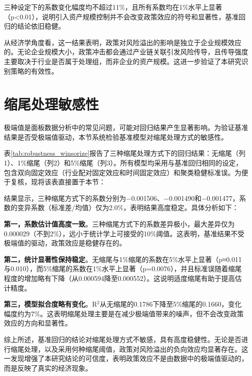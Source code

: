 三种设定下的系数变化幅度均不超过11\%，且所有系数均在1\%水平上显著（p<0.01），说明引入资产规模控制并不会改变政策效应的符号和显著性，基准回归的结论依旧稳健。

从经济学角度看，这一结果表明，政策对风险溢出的影响是独立于企业规模效应的。无论企业规模大小，政策冲击都会通过产业链关联引发风险传导，且传导强度主要取决于行业是否属于处理组，而非企业的资产规模。这进一步验证了本研究识别策略的有效性。


\section{缩尾处理敏感性}
\label{sec:robustness_winsorize}

极端值是面板数据分析中的常见问题，可能对回归结果产生显著影响。为验证基准结果是否受极端值驱动，本节系统检验基准模型对缩尾处理方式的敏感性。

表\ref{tab:robustness_winsorize}报告了三种缩尾处理方式下的回归结果：无缩尾（列1）、1\%缩尾（列2）和5\%缩尾（列3）。所有模型均采用与基准回归相同的设定，包含双向固定效应（行业配对固定效应和时间固定效应）和聚类稳健标准误。为便于复核，现将该表直接置于本节：

结果显示，三种缩尾方式下的系数分别为$-$0.001506、$-$0.001490和$-$0.001477，系数的变异系数（标准差/均值）仅为2.0\%，表明结果高度稳定。具体分析如下：

\textbf{第一，系数估计值高度一致}。三种缩尾方式下的系数差异极小，最大差异仅为0.000029（不到2\%），远小于统计学上可接受的10\%阈值。这表明，基准结果不受极端值的驱动，政策效应是稳健存在的。

\textbf{第二，统计显著性保持稳定}。无缩尾与1\%缩尾的系数在5\%水平上显著（p≈0.011与0.010），而5\%缩尾的系数在1\%水平上显著（p=0.0076），并且标准误随着缩尾程度的增加略有下降（从0.000594降至0.000552）。这说明适度缩尾有助于提高估计精度。

\textbf{第三，模型拟合度略有变化}。R$^2$从无缩尾的0.1786下降至5\%缩尾的0.1660，变化幅度约为7\%。这表明缩尾处理主要是在减少极端值带来的噪声，但不会改变政策效应的方向和显著性。

综上所述，基准回归的结论对缩尾处理方式不敏感，具有高度稳健性。无论是否进行缩尾处理，以及采用何种缩尾阈值，政策对风险溢出的负向效应均显著存在。这一发现增强了本研究结论的可信度，表明政策效应不是由数据中的极端值驱动的，而是反映了真实的经济现象。

